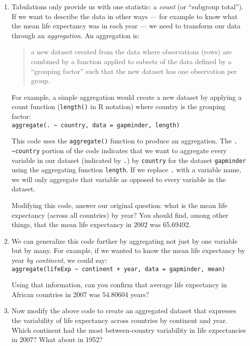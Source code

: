 \documentclass[a4paper,12pt]{article}
\begin{document}
\begin{enumerate}
\item Tabulations only provide us with one statistic: a \textit{count} (or ``subgroup total''). If we want to describe the data in other ways --- for example to know what the mean life expectancy was in each year --- we need to transform our data through an \textit{aggregation}. An aggregation is:

\begin{quote}
a new dataset created from the data where observations (rows) are combined by a function applied to subsets of the data defined by a ``grouping factor'' such that the new dataset has one observation per group.
\end{quote}

For example, a simple aggregation would create a new dataset by applying a count function (\texttt{length()} in R notation) where country is the grouping factor:\\
\texttt{aggregate(. \~{} country, data = gapminder, length)}

This code uses the \texttt{aggregate()} function to produce an aggregation. The \texttt{. \textasciitilde country} portion of the code indicates that we want to aggregate every variable in our dataset (indicated by \texttt{.}) by \texttt{country} for the dataset \texttt{gapminder} using the aggregating function \texttt{length}. If we replace \texttt{.} with a variable name, we will only aggregate that variable as opposed to every variable in the dataset.

Modifying this code, answer our original question: what is the mean life expectancy (across all countries) by year? You should find, among other things, that the mean life expectancy in 2002 was 65.69492.

\item We can generalize this code further by aggregating not just by one variable but by many. For example, if we wanted to know the mean life expectancy by year \textit{by continent}, we could say:\\
\texttt{aggregate(lifeExp \~{} continent + year, data = gapminder, mean)}

Using that information, can you confirm that average life expectancy in African countries in 2007 was 54.80604 years?

\item Now modify the above code to create an aggregated dataset that expresses the variability of life expectancy across countries by continent and year. Which continent had the most between-country variability in life expectancies in 2007? What about in 1952?


\end{enumerate}
\end{document}
